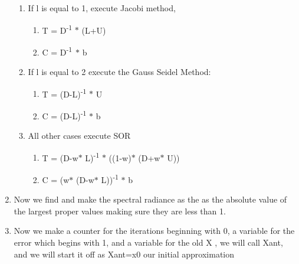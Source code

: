 \documentclass[12pt]{article}
\renewcommand{\_}{\kern-1.5pt\textunderscore\kern-1.5pt}
\begin{document}
\begin{enumerate}
\begin{enumerate}
	\item If l is equal to 1, execute Jacobi method,\par

\begin{enumerate}
	\item T = D\textsuperscript{-1 }$\ast$  (L+U)\par

	\item C = D\textsuperscript{-1\  }$\ast$  b\par


\end{enumerate}
	\item If l is equal to 2 execute the Gauss Seidel Method: \par

\begin{enumerate}
	\item T = (D-L)\textsuperscript{-1 }$\ast$  U\par

	\item C = (D-L)\textsuperscript{-1 }$\ast$  b\par


\end{enumerate}
	\item All other cases execute SOR\par

\begin{enumerate}
	\item T = (D-w$\ast$ L)\textsuperscript{-1 }$\ast$  ((1-w)$\ast$ (D+w$\ast$ U))\par

	\item C = (w$\ast$ (D-w$\ast$ L))\textsuperscript{-1} $\ast$  b\par


\end{enumerate}
\end{enumerate}
	\item Now we find and make the spectral radiance as the as the absolute value of the largest proper values making sure they are less than 1. \par

	\item Now we make a counter for the iterations beginning with 0, a variable for the error which begins with 1, and a variable for the old X , we will call Xant, and we will start it off as Xant=x0 our initial approximation\par


\end{enumerate}
\end{document}
